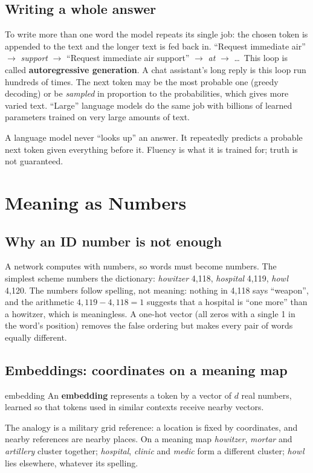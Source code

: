 \documentclass[11pt]{article}
\begin{document}
\subsection{Writing a whole answer}
To write more than one word the model repeats its single job: the chosen token is appended to the text and the longer text is fed back in. ``Request immediate air'' $\to$ \emph{support} $\to$ ``Request immediate air support'' $\to$ \emph{at} $\to$ \dots\ This loop is called \textbf{autoregressive generation}. A chat assistant's long reply is this loop run hundreds of times. The next token may be the most probable one (greedy decoding) or be \emph{sampled} in proportion to the probabilities, which gives more varied text. ``Large'' language models do the same job with billions of learned parameters trained on very large amounts of text.
\begin{keypoint}
A language model never ``looks up'' an answer. It repeatedly predicts a probable next token given everything before it. Fluency is what it is trained for; truth is not guaranteed.
\end{keypoint}

\section{Meaning as Numbers}
\subsection{Why an ID number is not enough}
A network computes with numbers, so words must become numbers. The simplest scheme numbers the dictionary: \emph{howitzer} 4,118, \emph{hospital} 4,119, \emph{howl} 4,120. The numbers follow spelling, not meaning: nothing in 4,118 says ``weapon'', and the arithmetic $4{,}119-4{,}118=1$ suggests that a hospital is ``one more'' than a howitzer, which is meaningless. A one-hot vector (all zeros with a single 1 in the word's position) removes the false ordering but makes every pair of words equally different.

\subsection{Embeddings: coordinates on a meaning map}
\begin{definition}{embedding}
An \textbf{embedding} represents a token by a vector of $d$ real numbers, learned so that tokens used in similar contexts receive nearby vectors.
\end{definition}
The analogy is a military grid reference: a location is fixed by coordinates, and nearby references are nearby places. On a meaning map \emph{howitzer}, \emph{mortar} and \emph{artillery} cluster together; \emph{hospital}, \emph{clinic} and \emph{medic} form a different cluster; \emph{howl} lies elsewhere, whatever its spelling.
\end{document}
